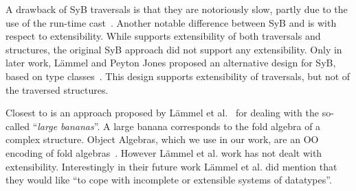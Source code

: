 A drawback of SyB traversals is that they are notoriously
slow, partly due to the use of the run-time
cast~\cite{adams2012tyb}. Another notable difference between SyB and
\name is with respect to extensibility. While \name supports
extensibility of both traversals and structures, the original SyB
approach did not support any extensibility. Only in later work,
L\"ammel and Peyton Jones proposed an alternative design for SyB,
based on type classes~\cite{wadler89type-classes}.
This design supports extensibility of traversals, but not of the
traversed structures.

\begin{comment}
In functional programming there has also been an important line of
work on \emph{datatype-generic programming} (DGP)~\cite{Gibbons07dgp}.  DGP is an
advanced form of \emph{generic programming}~\cite{GP}, where generic
functions are usually defined by inspecting the structure of
types.  Different approaches to DGP in Haskell have been extensively studied and documented~\cite{ComparingGPHaskellRodriquez,ComparingGPHaskellHinze}.
DGP can be used to implement structure-shy traversals as combinators,
similar to the traversals provided by SyB~\cite{hinze2003fun}.
Bringert~\cite{bjorn08acf}
introduced a DGP approach that can also be used to express queries
and transformations.
\end{comment}
Closest to \name is an approach proposed by
L\"ammel et al.~\cite{lammel00dealing} for dealing with the so-called
``\emph{large bananas}''. A large banana corresponds to the fold
algebra of a complex structure. Object Algebras, which we use in our
work, are an OO encoding of fold algebras~\cite{Oliveira08visitor,bruno12oa}.
However L\"ammel et al. work has not dealt with extensibility. Interestingly
in their future work  L\"ammel et al. did mention that they would like ``to cope
with incomplete or extensible systems of datatypes''.



\begin{comment}
In that
approach for generalized and basic folds. These fold algebras scale up
applications involving large systems of mutually recursive
datatypes. These works all try to optimize traversal control of large
structures in functional programming paradigm, while our work solves a
similar problem in Object Algebras, a programming style in Object
Oriented Programming paradigm.
\end{comment}

